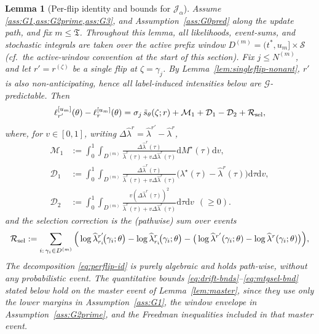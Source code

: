 \documentclass{statsoc}
\newtheorem{lemma}[lemma]{Lemma}
\newcommand{\dd}{\mathrm{d}}
\newcommand{\1}{\mathbbm{1}}
\newcommand{\Tmax}{\mathfrak{T}}
\begin{document}
\begin{lemma}[Per-flip identity and bounds for $\mathcal J_\alpha$]\label{lem:perflip}
Assume \cref{ass:G1,ass:G2prime,ass:G3}, and Assumption~\ref{ass:G0pred} along the update path, and fix $m\le \Tmax$. Throughout this lemma, all likelihoods, event-sums, and stochastic integrals are taken over the active prefix window
$D^{(m)}=(t^\ast,u_m]\times\mathcal S$ (cf.\ the active-window convention at the start of this section).
Fix $j \le N^{(m)}$, and let $r'=r^{(\zeta)}$ be a single flip at $\zeta=\gamma_j$. By Lemma~\ref{lem:singleflip-nonant}, $r'$ is also non-anticipating, hence all label-induced intensities below are $\mathcal G$-predictable. Then
\begin{equation}\label{eq:perflip-id}
\ell_{r'}^{[u_m]}(\theta)-\ell_r^{[u_m]}(\theta)
=\sigma_j\,\tilde s_\theta(\zeta;r)+\mathcal M_1+\mathcal D_1-\mathcal D_2+\mathcal R_{\rm sel},
\end{equation}
where, for $v\in[0,1]$, writing $\Delta\widehat\lambda^r=\widehat\lambda^{r'}-\widehat\lambda^{r}$,
\begin{align*}
\mathcal M_1&:=\int_0^1\!\!\int_{D^{(m)}} \frac{\Delta\widehat\lambda^r(\tau)}{\widehat\lambda^r(\tau)+v\Delta\widehat\lambda^r(\tau)} \dd M^\star(\tau)\dd v,\\
\mathcal D_1&:=\int_0^1\!\!\int_{D^{(m)}} \frac{\Delta\widehat\lambda^r(\tau)}{\widehat\lambda^r(\tau)+v\Delta\widehat\lambda^r(\tau)}\big(\lambda^\star(\tau)-\widehat\lambda^r(\tau)\big)\dd\tau\dd v,\\
\mathcal D_2&:=\int_0^1\!\!\int_{D^{(m)}} \frac{v (\Delta\widehat\lambda^r(\tau))^2}{\widehat\lambda^r(\tau)+v\Delta\widehat\lambda^r(\tau)} \dd\tau \dd v\ \ (\ge 0).
\end{align*}
and the selection correction is the (pathwise) sum over events
\[
\mathcal R_{\rm sel}
:=\sum_{i:\,\gamma_i\in D^{(m)}}\Big(
\log \widehat\lambda^{r'}_{r_i}\!\big(\gamma_i;\theta\big)
-\log \widehat\lambda^{r}_{r_i}\!\big(\gamma_i;\theta\big)
-\big(\log\widehat\lambda^{r'}(\gamma_i;\theta)-\log\widehat\lambda^{r}(\gamma_i;\theta)\big)
\Big),
\]
The decomposition \eqref{eq:perflip-id} is purely algebraic and holds path-wise, without any probabilistic event.
The quantitative bounds \eqref{eq:drift-bnds}--\eqref{eq:mtgsel-bnd} stated below hold on the master event of Lemma~\ref{lem:master}, since they use only the lower margins in Assumption~\ref{ass:G1}, the window envelope in Assumption~\ref{ass:G2prime}, and the Freedman inequalities included in that master event.
\end{lemma}
\end{document}
